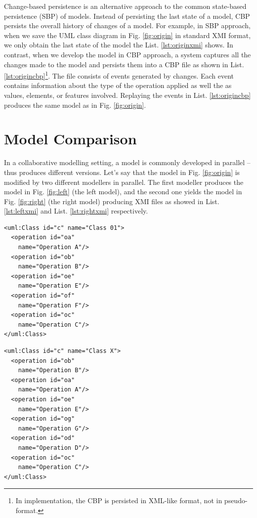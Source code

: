 \documentclass{llncs}
\begin{document}
Change-based persistence is an alternative approach to the common state-based persistence (SBP) of models. Instead of persisting the last state of a model, CBP persists the overall history of changes of a model. For example, in SBP approach, when we save the UML class diagram in Fig. \ref{fig:origin} in standard XMI format, we only obtain the last state of the model the List. \ref{lst:originxmi} shows. In contrast, when we develop the model in CBP approach, a system captures all the changes made to the model and persists them into a CBP file as shown in List. \ref{lst:origincbp}\footnote{In implementation, the CBP is persisted in XML-like format, not in pseudo-format.}. The file consists of events generated by changes. Each event contains information about the type of the operation applied as well the as values, elements, or features involved. Replaying the events in List. \ref{lst:origincbp} produces the same model as in Fig. \ref{fig:origin}.

\section{Model Comparison}
\label{sec:model_comparison}
In a collaborative modelling setting, a model is commonly developed in parallel -- thus produces different versions. Let's say that the model in Fig. \ref{fig:origin} is modified by two different modellers in parallel. The first modeller produces the model in Fig. \ref{fig:left} (the left model), and the second one yields the model in Fig. \ref{fig:right} (the right model) producing XMI files as showed in List. \ref{lst:leftxmi} and List. \ref{lst:rightxmi} respectively.

\begin{minipage}[t]{0.49\linewidth} 
\begin{lstlisting}[style=eol,caption={The simplified XMI of the left model in Fig. \ref{fig:left}.},label=lst:leftxmi]
<uml:Class id="c" name="Class 01">
  <operation id="oa" 
    name="Operation A"/>
  <operation id="ob" 
    name="Operation B"/>
  <operation id="oe" 
    name="Operation E"/>
  <operation id="of" 
    name="Operation F"/>
  <operation id="oc" 
    name="Operation C"/>
</uml:Class>
\end{lstlisting}
\end{minipage}
\hfill
\begin{minipage}[t]{0.49\linewidth}
\begin{lstlisting}[style=eol,caption={The simplified XMI of the right model in Fig. \ref{fig:right}.},label=lst:rightxmi]
<uml:Class id="c" name="Class X">
  <operation id="ob" 
    name="Operation B"/>
  <operation id="oa" 
    name="Operation A"/>
  <operation id="oe" 
    name="Operation E"/>
  <operation id="og" 
    name="Operation G"/>
  <operation id="od" 
    name="Operation D"/>
  <operation id="oc" 
    name="Operation C"/>
</uml:Class>
\end{lstlisting}
\end{minipage}
\end{document}
